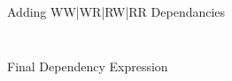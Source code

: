 \documentclass[notes xcolor=dvipsnames]{beamer}
\begin{document}
    \begin{frame}{Adding WW|WR|RW|RR Dependancies}

        \begin{figure}
        \end{figure}

        \begin{columns}
            
            \begin{column}{0.5\textwidth}

                \begin{figure}
                \end{figure}
                
            \end{column}

            \begin{column}{0.5\textwidth}
                
                \begin{figure}
                \end{figure}

            \end{column}

        \end{columns}
        
    \end{frame}

    \begin{frame}{Final Dependency Expression}

        \begin{figure}
        \end{figure}
        
    \end{frame}
    
\end{document}
